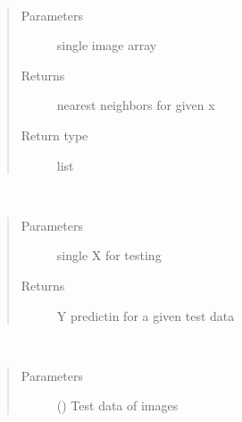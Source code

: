 \documentclass[letterpaper,10pt,english]{sphinxmanual}
\begin{document}
\begin{fulllineitems}
\begin{fulllineitems}
\label{\detokenize{classifiers:classifiers.knn.KNN.get_nearest_neighbors}}~\begin{quote}\begin{description}
\item[{Parameters}] \leavevmode
{} \textendash{} single image array

\item[{Returns}] \leavevmode
nearest neighbors for given x

\item[{Return type}] \leavevmode
list

\end{description}\end{quote}

\end{fulllineitems}


\begin{fulllineitems}
\label{\detokenize{classifiers:classifiers.knn.KNN.get_prediction}}~\begin{quote}\begin{description}
\item[{Parameters}] \leavevmode
{} \textendash{} single X for testing

\item[{Returns}] \leavevmode
Y predictin for a given test data

\end{description}\end{quote}

\end{fulllineitems}


\begin{fulllineitems}
\label{\detokenize{classifiers:classifiers.knn.KNN.k}}
\end{fulllineitems}


\begin{fulllineitems}
\label{\detokenize{classifiers:classifiers.knn.KNN.predict}}~\begin{quote}\begin{description}
\item[{Parameters}] \leavevmode
{} () \textendash{} Test data of images


\end{description}
\end{quote}
\end{fulllineitems}
\end{fulllineitems}
\end{document}
